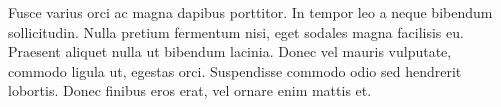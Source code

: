 \documentclass{article}
\begin{document}

Fusce varius orci ac magna dapibus porttitor. In tempor leo a neque bibendum sollicitudin. Nulla pretium fermentum nisi, eget sodales magna facilisis eu. Praesent aliquet nulla ut bibendum lacinia. Donec vel mauris vulputate, commodo ligula ut, egestas orci. Suspendisse commodo odio sed hendrerit lobortis. Donec finibus eros erat, vel ornare enim mattis et.



\end{document}
